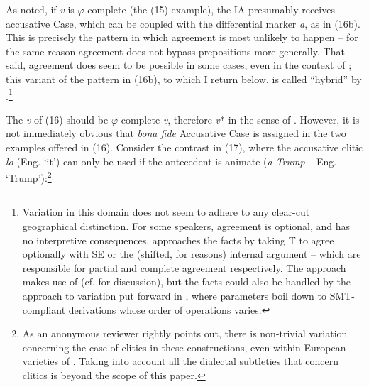 \documentclass[output=paper]{langsci/langscibook}
\begin{document}
As noted, if \textit{v} is $\varphi $-complete (the (15) example), the IA presumably receives accusative Case, which can be coupled with the differential marker \textit{a}, as in (16b). This is precisely the pattern in which agreement is most unlikely to happen – for the same reason agreement does not bypass prepositions more generally. That said, agreement does seem to be possible in some cases, even in the context of \DOM; this variant of the pattern in (16b), to which I return below, is called “hybrid” by \citet{RAE-ASALE2009}.\footnote{Variation in this domain does not seem to adhere to any clear-cut geographical distinction. For some speakers, agreement is optional, and has no interpretive consequences. \citet{Planells2017} approaches the facts by taking T to agree optionally with SE or the (shifted, for \DOM reasons) internal argument – which are responsible for partial and complete agreement respectively. The approach makes use of   (cf. \citealt{Gallego2013} for discussion), but the facts could also be handled by the approach to variation put forward in \citet{Obata2016}, where parameters boil down to SMT-compliant derivations whose order of operations varies.}

The \textit{v} of (16) should be $\varphi $-complete \textit{v}, therefore \textit{v}* in the sense of \citet{Chomsky2001Derivation}. However, it is not immediately obvious that \textit{bona fide} Accusative Case is assigned in the two examples offered in (16). Consider the contrast in (17), where the accusative clitic \textit{lo} (Eng. ‘it’) can only be used if the antecedent is animate (\textit{a Trump} – Eng. ‘Trump’):\footnote{As an anonymous reviewer rightly points out, there is non-trivial variation concerning the case of clitics in these constructions, even within European varieties of . Taking into account all the dialectal subtleties that concern clitics is beyond the scope of this paper.}

\ea%
    \label{ex:gallego:17}
    \z
\z   
\end{document}

